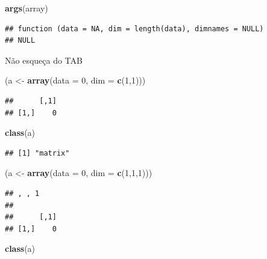 \documentclass[]{book}
\newenvironment{Shaded}{\begin{snugshade}}{\end{snugshade}}
\newcommand{\KeywordTok}[1]{\textcolor[rgb]{0.13,0.29,0.53}{\textbf{#1}}}
\newcommand{\DataTypeTok}[1]{\textcolor[rgb]{0.13,0.29,0.53}{#1}}
\newcommand{\DecValTok}[1]{\textcolor[rgb]{0.00,0.00,0.81}{#1}}
\newcommand{\StringTok}[1]{\textcolor[rgb]{0.31,0.60,0.02}{#1}}
\newcommand{\NormalTok}[1]{#1}
\theoremstyle{definition}
\theoremstyle{definition}
\theoremstyle{definition}
\theoremstyle{remark}
\begin{document}
\begin{Shaded}
\begin{Highlighting}[]
\KeywordTok{args}\NormalTok{(array)}
\end{Highlighting}
\end{Shaded}

\begin{verbatim}
## function (data = NA, dim = length(data), dimnames = NULL) 
## NULL
\end{verbatim}

Não esqueça do TAB

\begin{Shaded}
\begin{Highlighting}[]
\NormalTok{(a <-}\StringTok{ }\KeywordTok{array}\NormalTok{(}\DataTypeTok{data =} \DecValTok{0}\NormalTok{, }\DataTypeTok{dim =} \KeywordTok{c}\NormalTok{(}\DecValTok{1}\NormalTok{,}\DecValTok{1}\NormalTok{)))}
\end{Highlighting}
\end{Shaded}

\begin{verbatim}
##      [,1]
## [1,]    0
\end{verbatim}

\begin{Shaded}
\begin{Highlighting}[]
\KeywordTok{class}\NormalTok{(a)}
\end{Highlighting}
\end{Shaded}

\begin{verbatim}
## [1] "matrix"
\end{verbatim}

\begin{Shaded}
\begin{Highlighting}[]
\NormalTok{(a <-}\StringTok{ }\KeywordTok{array}\NormalTok{(}\DataTypeTok{data =} \DecValTok{0}\NormalTok{, }\DataTypeTok{dim =} \KeywordTok{c}\NormalTok{(}\DecValTok{1}\NormalTok{,}\DecValTok{1}\NormalTok{,}\DecValTok{1}\NormalTok{)))}
\end{Highlighting}
\end{Shaded}

\begin{verbatim}
## , , 1
## 
##      [,1]
## [1,]    0
\end{verbatim}

\begin{Shaded}
\begin{Highlighting}[]
\KeywordTok{class}\NormalTok{(a)}
\end{Highlighting}
\end{Shaded}
\end{document}
